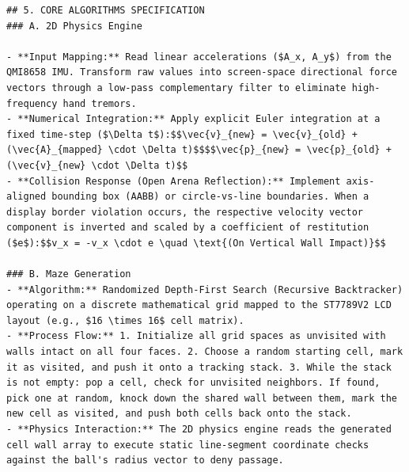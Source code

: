 \begin{lstlisting}[language={}, breaklines=true]
## 5. CORE ALGORITHMS SPECIFICATION
### A. 2D Physics Engine

- **Input Mapping:** Read linear accelerations ($A_x, A_y$) from the QMI8658 IMU. Transform raw values into screen-space directional force vectors through a low-pass complementary filter to eliminate high-frequency hand tremors.
- **Numerical Integration:** Apply explicit Euler integration at a fixed time-step ($\Delta t$):$$\vec{v}_{new} = \vec{v}_{old} + (\vec{A}_{mapped} \cdot \Delta t)$$$$\vec{p}_{new} = \vec{p}_{old} + (\vec{v}_{new} \cdot \Delta t)$$
- **Collision Response (Open Arena Reflection):** Implement axis-aligned bounding box (AABB) or circle-vs-line boundaries. When a display border violation occurs, the respective velocity vector component is inverted and scaled by a coefficient of restitution ($e$):$$v_x = -v_x \cdot e \quad \text{(On Vertical Wall Impact)}$$

### B. Maze Generation
- **Algorithm:** Randomized Depth-First Search (Recursive Backtracker) operating on a discrete mathematical grid mapped to the ST7789V2 LCD layout (e.g., $16 \times 16$ cell matrix).
- **Process Flow:** 1. Initialize all grid spaces as unvisited with walls intact on all four faces. 2. Choose a random starting cell, mark it as visited, and push it onto a tracking stack. 3. While the stack is not empty: pop a cell, check for unvisited neighbors. If found, pick one at random, knock down the shared wall between them, mark the new cell as visited, and push both cells back onto the stack.
- **Physics Interaction:** The 2D physics engine reads the generated cell wall array to execute static line-segment coordinate checks against the ball's radius vector to deny passage.

\end{lstlisting}
